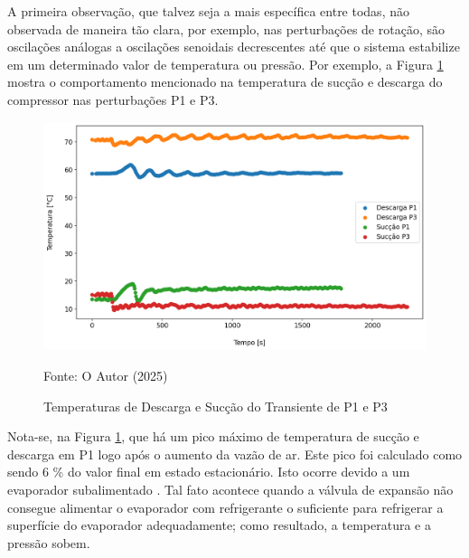 A primeira observação, que talvez seja a mais específica entre todas, não observada de maneira tão clara, por exemplo, nas perturbações de rotação, são oscilações análogas a oscilações senoidais decrescentes até que o sistema estabilize em um determinado valor de temperatura ou pressão. Por exemplo, a Figura \ref{fig:TempSuccaoPertubacaoVentilador} mostra o comportamento mencionado na temperatura de sucção e descarga do compressor nas perturbações P1 e P3.
\newpage
\begin{figure}[h]
    \centering
    \includegraphics[width=1\linewidth]{FigurasdoTexto/Temperaturas de descarga e sucção Transiente P1 e P3.png}
    \caption{Temperaturas de Descarga e Sucção do Transiente de P1 e P3}
    \label{fig:TempSuccaoPertubacaoVentilador}
    {\footnotesize Fonte: O Autor (2025)}
\end{figure}

Nota-se, na Figura \ref{fig:TempSuccaoPertubacaoVentilador}, que há um pico máximo de temperatura de sucção e descarga em P1 logo após o aumento da vazão de ar. Este pico foi calculado como sendo 6 \% do valor final em estado estacionário. Isto ocorre devido a um evaporador subalimentado \cite{StoekerRefrigeration}. Tal fato acontece quando a válvula de expansão não consegue alimentar o evaporador com refrigerante o suficiente para refrigerar a superfície do evaporador adequadamente; como resultado, a temperatura e a pressão sobem.

